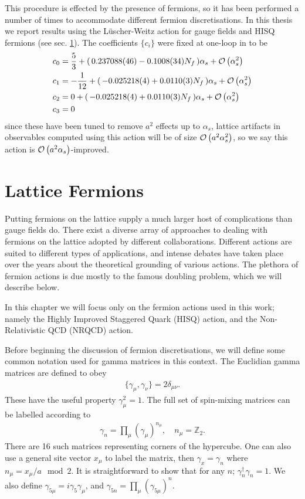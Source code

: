 This procedure is effected by the presence of fermions, so it has been performed a number of times to accommodate different fermion discretisations. In this thesis we report results using the L\"uscher-Weitz action for gauge fields and HISQ fermions (see sec. \ref{sec:fermions}). The coefficients $\{c_i\}$ were fixed at one-loop %
in \cite{Hart:2008sq} to be
\begin{align}
  c_0& = {5\over 3} + ( \,0.237088(46) - 0.1008(34) N_f \,) \alpha_s + \mathcal{O}\left( \alpha_s^2 \right)\\
  c_1& = -{1\over 12} + ( \,-0.025218(4) + 0.0110(3) N_f \,) \alpha_s + \mathcal{O}\left( \alpha_s^2 \right)\\
  c_2& = 0 + ( \,-0.025218(4) + 0.0110(3) N_f \,) \alpha_s + \mathcal{O}\left( \alpha_s^2 \right) \\
  c_3& = 0
\end{align}
since these have been tuned to remove $a^2$ effects up to $\alpha_s$, lattice artifacts in observables computed using this action will be of size $\mathcal{O}\left( a^2\alpha_s^2 \right)$, so we say this action is $\mathcal{O}\left( a^2\alpha_s \right)$-improved.

\section{Lattice Fermions}
\label{sec:fermions}

Putting fermions on the lattice supply a much larger host of complications than gauge fields do. There exist a diverse array of approaches to dealing with fermions on the lattice adopted by different collaborations. Different actions are suited to different types of applications, and intense debates have taken place over the years about the theoretical grounding of various actions. The plethora of fermion actions is due mostly to the famous doubling problem, which we will describe below.

In this chapter we will focus only on the fermion actions used in this work; namely the Highly Improved Staggered Quark (HISQ) action, and the Non-Relativistic QCD (NRQCD) action.

Before beginning the discussion of fermion discretisations, we will define some common notation used for gamma matrices in this context. The Euclidian gamma matrices are defined to obey
\begin{align}
  \{\gamma_{\mu},\gamma_{\nu}\} = 2\delta_{\mu\nu}.
\end{align}
These have the useful property $\gamma_{\mu}^2=1$. The full set of spin-mixing matrices can be labelled according to
\begin{align}
  \gamma_n = \prod_{\mu} \left( \gamma_{\mu} \right)^{n_{\mu}}, \quad n_{\mu} = \mathbb{Z}_2.
\end{align}
There are 16 such matrices representing corners of the hypercube. One can also use a general site vector $x_{\mu}$ to label the matrix, then $\gamma_x = \gamma_n$ where $n_{\mu} = x_{\mu}/a \mod 2$. It is straightforward to show that for any $n$; $\gamma_n^{\dagger} \gamma_n = 1$. We also define $\gamma_{5\mu} = i\gamma_5\gamma_{\mu}$, and $\gamma_{5n} = \prod_{\mu}(\gamma_{5\mu})^n$.

